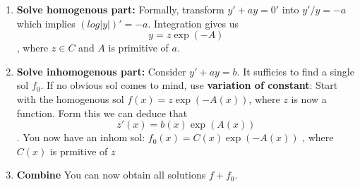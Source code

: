 \begin{concept}
	$ $\\
	\begin{enumerate}
		\item \textbf{Solve homogenous part:}
			Formally, transform $y' + ay = 0'$ into $y'/y = -a$ which implies $(log|y|)' = -a$.
			Integration gives us
			$$ y = z\exp(-A) $$
			, where $z \in C$ and $A$ is primitive of $a$.
		\item \textbf{Solve inhomogenous part:}
			Consider $y' + ay = b$.
			It sufficies to find a single sol $f_0$.
			If no obvious sol comes to mind, use \textbf{variation of constant}:
			Start with the homogenous sol $f(x) = z\exp(-A(x))$, where $z$ is now a function.
			Form this we can deduce that
			$$z'(x) = b(x)\exp(A(x))$$.
			You now have an inhom sol: $f_0(x) = C(x)\exp(-A(x))$
			, where $C(x)$ is prmitive of $z$
		\item \textbf{Combine}
			You can now obtain all solutions $f + f_0$.
	\end{enumerate}
\end{concept}

